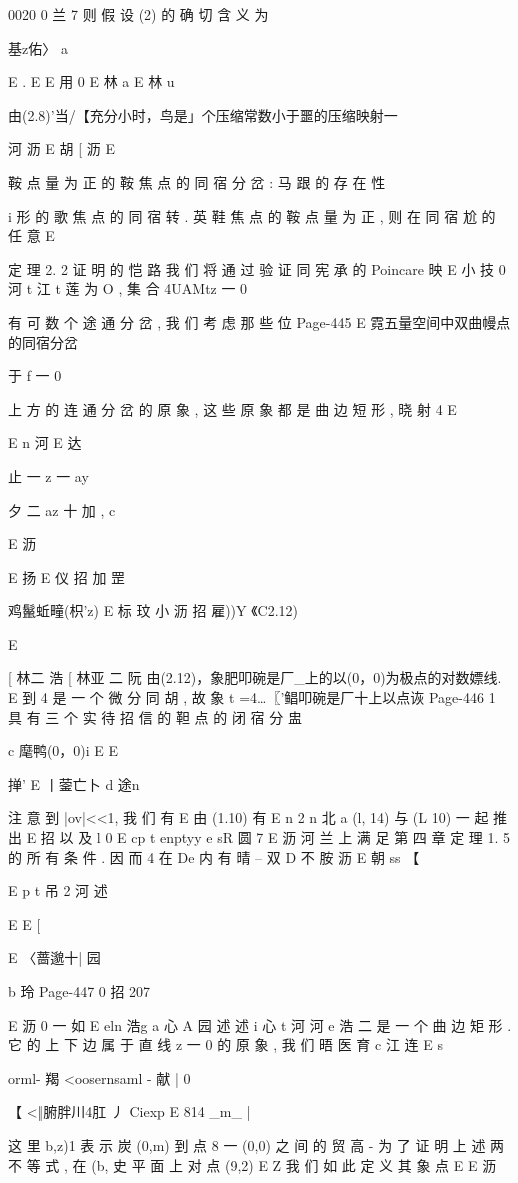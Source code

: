 {{{{{{{{0020 0 兰 7
则 假 设 (2) 的 确 切 含 义 为

基z佑〉 a

E .
E
E 用
0
E 林 a
E 林
u

由(2.8)'当/【充分小时，鸟是」个压缩常数小于噩的压缩映射一

河 沥
E 胡 [ 沥
E

鞍 点 量 为 正 的 鞍 焦 点 的 同 宿 分 岔 : 马 跟 的 存 在 性

i
形 的 歌 焦 点 的 同 宿 转 . 英 鞋 焦 点 的 鞍 点 量 为 正 , 则 在 同 宿 尬 的 任 意
E

定 理 2. 2 证 明 的 恺 路 我 们 将 通 过 验 证 同 宪 承 的 Poincare 映
E 小 技
0
河
t 江 t 莲
为 O , 集 合 4UAMtz 一 0} 有 可 数 个 途 通 分 岔 , 我 们 考 虑 那 些 位
Page-445
E 霓五量空间中双曲幔点的同宿分岔

于 f 一 0} 上 方 的 连 通 分 岔 的 原 象 , 这 些 原 象 都 是 曲 边 短 形 , 晓 射 4
E

E
n 河
E 达

止 一 z 一 ay
{夕 二 az 十 加 ,
c

E 沥

E 扬
E 仪 招 加 罡

鸡鬣蚯疃(枳'z) E 标 玟 小 沥 招 雇))Y 《C2.12)

E

[ 林二 浩 [ 林亚 二 阮
由(2.12)，象肥叩碗是厂_上的以(0，0)为极点的对数嫖线. E
到 4 是 一 个 微 分 同 胡 , 故 象 t =4…〖'鲳叩碗是厂十上以点诙
Page-446
1 具 有 三 个 实 待 招 信 的 靼 点 的 闭 宿 分 盅

c 麾鸭(0，0)i E E

掸' E 丨蓥亡卜 d 途n

注 意 到 |ov|<<1, 我 们 有
E
由 (1.10) 有
E n 2 n 北 a
(l, 14) 与 (L 10) 一 起 推 出
E 招
以 及
l 0
E cp t enptyy e sR 圆 7 E 沥 河
兰 上 满 足 第 四 章 定 理 1. 5 的 所 有 条 件 . 因 而 4 在 De 内 有 晴 -- 双
D 不 胺
沥
E 朝
ss
【

E
p
t 吊 2 河 述

E E
[

E
〈蔷邈十| 园

b 玲
Page-447
0 招 207

E 沥 0 一 如
E eln 浩g a 心 A
园 述
述 i 心 t 河 河 e 浩
二 是 一 个 曲 边 矩 形 . 它 的 上 下 边 属 于 直 线 {z 一 0} 的 原 象 , 我 们 晤
医 育 c 江 连 E s

orml- 羯 <oosernsaml - 献 |
0

【 <‖腑胖川4肛 丿 Ciexp E 814
_m_ |

这 里 b,z)1 表 示 炭 (0,m) 到 点 8 一 (0,0) 之 间 的 贸 高 - 为 了 证 明 上
述 两 不 等 式 , 在 (b, 史 平 面 上 对 点 (9,2) E Z 我 们 如 此 定 义 其 象 点
E
E 沥

}}}}}}}
